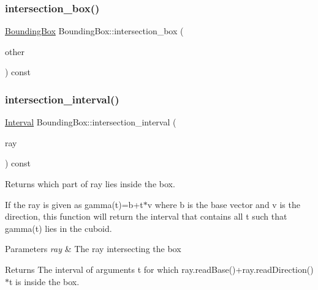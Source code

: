 \mbox{\label{classBoundingBox_ab235900033f5b916bc0729278f20d776}} 
\subsubsection{\texorpdfstring{intersection\_box()}{intersection\_box()}}
{\footnotesize\ttfamily \mbox{\hyperlink{classBoundingBox}{Bounding\+Box}} Bounding\+Box\+::intersection\+\_\+box (\begin{DoxyParamCaption}\item[{const \mbox{\hyperlink{classBoundingBox}{Bounding\+Box}} \&}]{other }\end{DoxyParamCaption}) const}

\mbox{\label{classBoundingBox_a10b6d0c6aa3a44a22584425a240d21ad}} 
\subsubsection{\texorpdfstring{intersection\_interval()}{intersection\_interval()}}
{\footnotesize\ttfamily \mbox{\hyperlink{classInterval}{Interval}} Bounding\+Box\+::intersection\+\_\+interval (\begin{DoxyParamCaption}\item[{const \mbox{\hyperlink{classRay}{Ray}} \&}]{ray }\end{DoxyParamCaption}) const}



Returns which part of ray lies inside the box. 

If the ray is given as gamma(t)=b+t$\ast$v where b is the base vector and v is the direction, this function will return the interval that contains all t such that gamma(t) lies in the cuboid.


\begin{DoxyParams}{Parameters}
{\em ray} & The ray intersecting the box \\
\hline
\end{DoxyParams}
\begin{DoxyReturn}{Returns}
The interval of arguments t for which ray.\+read\+Base()+ray.\+read\+Direction()$\ast$t is inside the box. 
\end{DoxyReturn}
\mbox{\label{classBoundingBox_aefbe16b0abb24dd2efc8ca5a0bfd41ca}} 
